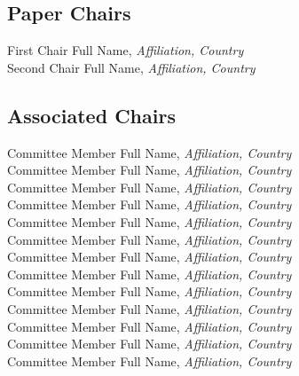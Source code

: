 
\subsection{Paper Chairs}
First Chair Full Name, \emph{Affiliation, Country}\\
Second Chair Full Name, \emph{Affiliation, Country}



\subsection{Associated Chairs}
Committee Member Full Name, \emph{Affiliation, Country}\\
Committee Member Full Name, \emph{Affiliation, Country}\\
Committee Member Full Name, \emph{Affiliation, Country}\\
Committee Member Full Name, \emph{Affiliation, Country}\\
Committee Member Full Name, \emph{Affiliation, Country}\\
Committee Member Full Name, \emph{Affiliation, Country}\\
Committee Member Full Name, \emph{Affiliation, Country}\\
Committee Member Full Name, \emph{Affiliation, Country}\\
Committee Member Full Name, \emph{Affiliation, Country}\\
Committee Member Full Name, \emph{Affiliation, Country}\\
Committee Member Full Name, \emph{Affiliation, Country}\\
Committee Member Full Name, \emph{Affiliation, Country}\\
Committee Member Full Name, \emph{Affiliation, Country}\\


